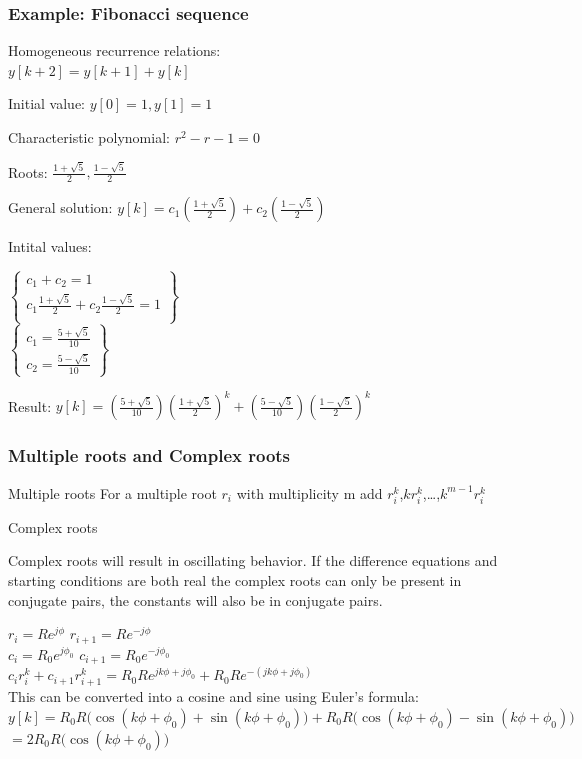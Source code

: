 \begin{frame}
	\frametitle{Example: Fibonacci sequence}
	\begin{example}
		\begin{itemize}
			\footnotesize{
			\setlength\itemsep{0em}
			\item Homogeneous recurrence relations: \\ $y[k+2] = y[k+1] + y[k]$
			\item Initial value: $y[0]=1, y[1]= 1$
			\item Characteristic polynomial: $r^2 - r - 1=0$ 
			\item Roots: $\frac{1+\sqrt{5}}{2}, \frac{1-\sqrt{5}}{2}$
			\item General solution: $y[k] = c_1(\frac{1+\sqrt{5}}{2}) + c_2(\frac{1-\sqrt{5}}{2})$
			\item Intital values: 
			\begin{center}
				$
				\begin{Bmatrix}
				c_1+ c_2 = 1\\
				c_1 \frac{1+\sqrt{5}}{2} + c_2 \frac{1-\sqrt{5}}{2} = 1  \\
				\end{Bmatrix}
				$\\
				$
				\begin{Bmatrix}
				c_1 = \frac{5+\sqrt{5}}{10}  \\
				c_2 = \frac{5-\sqrt{5}}{10}
				\end{Bmatrix}
				$\\
			\end{center}
			\item Result: $y[k] =  (\frac{5+\sqrt{5}}{10})(\frac{1+\sqrt{5}}{2})^{k} +(\frac{5-\sqrt{5}}{10}) (\frac{1-\sqrt{5}}{2})^{k}$}
		\end{itemize}
	\end{example}
\end{frame}
\begin{frame}
	\frametitle{Multiple roots and Complex roots}
	\begin{block}{Multiple roots}
		For a multiple root $r_i$ with multiplicity m add $r_i^k$,$kr_i^k$,\dots,$k^{m-1}r_i^{k}$
	\end{block}
	\begin{block}{Complex roots}
		\scriptsize{
		Complex roots will result in oscillating behavior.
		If the difference equations and starting conditions are both real the complex roots can only be present in conjugate pairs, the constants will also be in conjugate pairs.
		\begin{center}
				$ r_i = Re^{j\phi}$ 	$r_{i+1} = Re^{-j\phi}$\\
				$c_i = R_0e^{j\phi_0}$	 $c_{i+1} = R_0e^{-j\phi_0}$\\
				$c_ir_i^k+c_{i+1}r_{i+1}^k = R_0Re^{jk\phi+j\phi_0} +  R_0Re^{-(jk\phi+j\phi_0)} $\\
				This can be converted into a cosine and sine using Euler’s formula:	
				$y[k] = R_0R\big(\cos(k\phi+\phi_0) + \sin(k\phi+\phi_0) \big) + R_0R\big(\cos(k\phi+\phi_0) - \sin(k\phi+\phi_0) \big)$ \\
						 $= 2R_0R\big(\cos(k\phi+\phi_0)\big)$			
		\end{center}}
	\end{block}
\end{frame}
